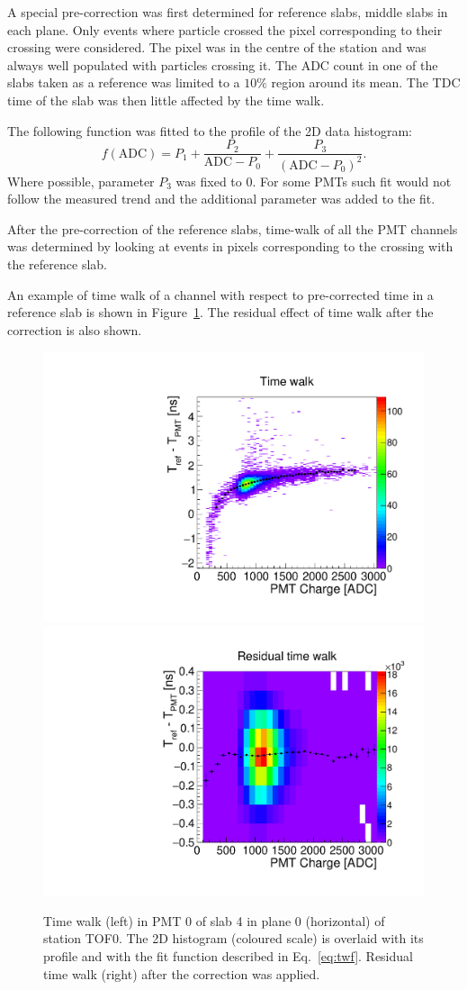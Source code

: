A special pre-correction was first determined for reference slabs,
middle slabs in each plane. Only events where particle crossed the
pixel corresponding to their crossing were considered. The pixel
was in the centre of the station and was always well populated with
particles crossing it.  The ADC count in one of the slabs taken as a
reference was limited to a $10\%$ region around its mean. The TDC time
of the slab was then little affected by the time walk.

The following function was fitted to the profile of the 2D data histogram:
%
\begin{equation}
  \newcommand{\ADC}{\text{ADC}}
  \label{eq:twf}
  f(\ADC) = P_1 + \frac{P_2}{\ADC - P_0} + \frac{P_3}{\left(\ADC - P_0\right)^2}.
\end{equation}
%
Where possible, parameter $P_3$ was fixed to 0. For some PMTs such fit
would not follow the measured trend and the additional parameter was
added to the fit.

After the pre-correction of the reference slabs, time-walk of all the
PMT channels was determined by looking at events in pixels
corresponding to the crossing with the reference slab.

An example of time walk of a channel with respect to pre-corrected
time in a reference slab is shown in Figure~\ref{fig:TW}. The residual
effect of time walk after the correction is also shown.

\begin{figure}
  \begin{center}
  \includegraphics[width=0.40\columnwidth]{01_tw_example}
  \includegraphics[width=0.45\columnwidth]{03_residual_tw_example} \\
  \caption{Time walk (left) in PMT 0 of slab 4 in plane 0 (horizontal)
    of station TOF0. The 2D histogram (coloured scale) is overlaid
    with its profile and with the fit function described in
    Eq.~\ref{eq:twf}.  Residual time walk (right) after the
    correction was applied.  }
  \label{fig:TW}
  \end{center}
\end{figure}



